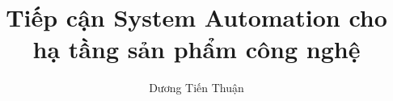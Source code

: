 \documentclass[14pt,a4paper,oneside,fleqn,openright]{extbook}
\renewcommand{\baselinestretch}{1.50}\normalsize
\begin{document}
\author{Dương Tiến Thuận}
\title{Tiếp cận System Automation cho hạ tầng sản phẩm công nghệ}

\frontmatter
\pagestyle{empty}


\newpage


\renewcommand{\baselinestretch}{1}\normalsize

\tableofcontents
\listoffigures
\listoftables
\lstlistoflistings
{}

\renewcommand{\baselinestretch}{1.50}\normalsize
\mainmatter
\pagestyle{fancy}
\newpage


\newpage


\newpage


\backmatter
\pagestyle{empty}


\newpage

\end{document}

